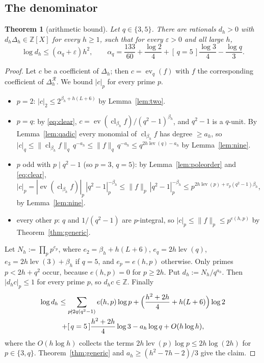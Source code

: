 \documentclass[11pt]{amsart}
\newtheorem{theorem}{Theorem}[section]
\theoremstyle{definition}
\theoremstyle{remark}
\numberwithin{equation}{section}
\newcommand{\ZZ}{\mathbb{Z}}
\newcommand{\cR}{\mathcal{R}}
\newcommand{\eps}{\varepsilon}
\newcommand{\ind}[1]{[\,#1\,]}
\newcommand{\lev}{\operatorname{lev}}
\begin{document}
\subsection{The denominator}

\begin{theorem}[arithmetic bound]\label{thm:arith}
Let $q\in\{3,5\}$. There are rationals $d_h>0$ with $d_h\Delta_h\in\ZZ[X]$ for every $h\ge1$, such that for every
$\eps>0$ and all large $h$,
\[
  \log d_h\le(\alpha_q+\eps)h^2,\qquad
  \alpha_q=\frac{133}{60}+\frac{\log2}4+\ind{q=5}\frac{\log3}4-\frac{\log q}3 .
\]
\end{theorem}

\begin{proof}
Let $c$ be a coefficient of $\Delta_h$; then $c=\operatorname{ev}_q(f)$ with $f$ the corresponding coefficient of
$\Delta^{\cR}_h$. We bound $|c|_p$ for every prime $p$.
\begin{itemize}
\item $p=2$: $|c|_2\le2^{\beta_h+h(L+6)}$ by Lemma~\ref{lem:two}.
\item $p=q$: by \eqref{eq:clear}, $c=\operatorname{ev}(\operatorname{cl}_{\beta_h}f)/(q^2-1)^{\beta_h}$, and $q^2-1$ is a $q$-unit.
  By Lemma~\ref{lem:qadic} every monomial of $\operatorname{cl}_{\beta_h}f$ has degree $\ge a_h$, so
  $|c|_q\le\|\operatorname{cl}_{\beta_h}f\|_q\,q^{-a_h}\le\|f\|_q\,q^{-a_h}\le q^{2h\lev(q)-a_h}$ by Lemma~\ref{lem:nine}.
\item $p$ odd with $p\mid q^2-1$ (so $p=3$, $q=5$): by Lemma~\ref{lem:poleorder} and \eqref{eq:clear},
  $|c|_p=|\operatorname{ev}(\operatorname{cl}_{\beta_h}f)|_p\,|q^2-1|_p^{-\beta_h}\le\|f\|_p\,|q^2-1|_p^{-\beta_h}\le
  p^{2h\lev(p)+v_p(q^2-1)\beta_h}$, by Lemma~\ref{lem:nine}.
\item every other $p$: $q$ and $1/(q^2-1)$ are $p$-integral, so $|c|_p\le\|f\|_p\le p^{e(h,p)}$ by
  Theorem~\ref{thm:generic}.
\end{itemize}
Let $N_h:=\prod_pp^{e_p}$, where $e_2=\beta_h+h(L+6)$, $e_q=2h\lev(q)$, $e_3=2h\lev(3)+\beta_h$ if $q=5$, and $e_p=e(h,p)$
otherwise. Only primes $p<2h+q^2$ occur, because $e(h,p)=0$ for $p\ge2h$. Put $d_h:=N_h/q^{a_h}$. Then
$|d_hc|_p\le1$ for every prime $p$, so $d_hc\in\ZZ$. Finally
\begin{multline*}
  \log d_h\le\sum_{p\nmid2q(q^2-1)}e(h,p)\log p+\Bigl(\frac{h^2+2h}4+h(L+6)\Bigr)\log2\\
  +\ind{q=5}\frac{h^2+2h}4\log3-a_h\log q+O(h\log h),
\end{multline*}
where the $O(h\log h)$ collects the terms $2h\lev(p)\log p\le2h\log(2h)$ for $p\in\{3,q\}$. Theorem~\ref{thm:generic}
and $a_h\ge(h^2-7h-2)/3$ give the claim.
\end{proof}
\end{document}
